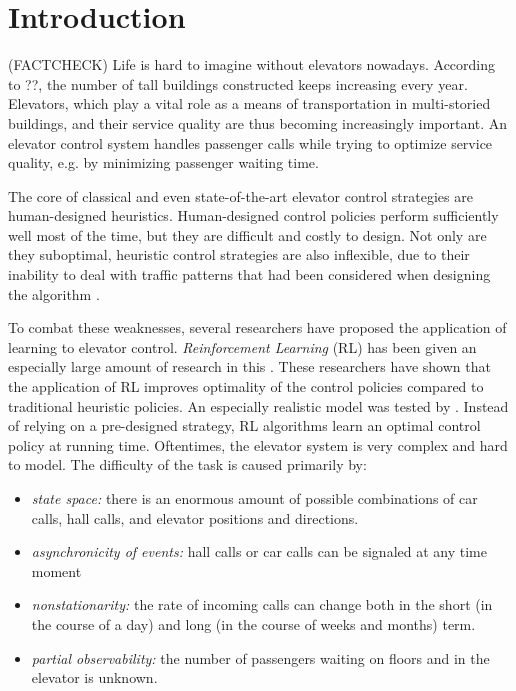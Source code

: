 \section{Introduction}

(FACTCHECK)
Life is hard to imagine without elevators nowadays. According to ??, the number of tall buildings constructed keeps increasing every year. Elevators, which play a vital role as a means of transportation in multi-storied buildings, and their service quality are thus becoming increasingly important. An elevator control system handles passenger calls while trying to optimize service quality, e.g. by minimizing passenger waiting time.

The core of classical and even state-of-the-art elevator control strategies are human-designed heuristics. Human-designed control policies perform sufficiently well most of the time, but they are difficult and costly to design. Not only are they suboptimal, heuristic control strategies are also inflexible, due to their inability to deal with traffic patterns that had been considered when designing the algorithm \cite{walczak2006}.

To combat these weaknesses, several researchers have proposed the application of learning to elevator control. \textit{Reinforcement Learning} (RL) has been given an especially large amount of research in this \cite{crites_barto_1998, pepyne_97, walczak2006, yuan_2008, li_2015}. These researchers have shown that the application of RL improves optimality of the control policies compared to traditional heuristic policies. An especially realistic model was tested by \cite{walczak2006}. Instead of relying on a pre-designed strategy, RL algorithms learn an optimal control policy at running time. Oftentimes, the elevator system is very complex and hard to model. The difficulty of the task is caused primarily by:
\begin{itemize}
    \item \textit{state space:} there is an enormous amount of possible combinations of car calls, hall calls, and elevator positions and directions.
    \item \textit{asynchronicity of events:} hall calls or car calls can be signaled at any time moment
    \item \textit{nonstationarity:} the rate of incoming calls can change both in the short (in the course of a day) and long (in the course of weeks and months) term.
    \item \textit{partial observability:} the number of passengers waiting on floors and in the elevator is unknown.
\end{itemize}


